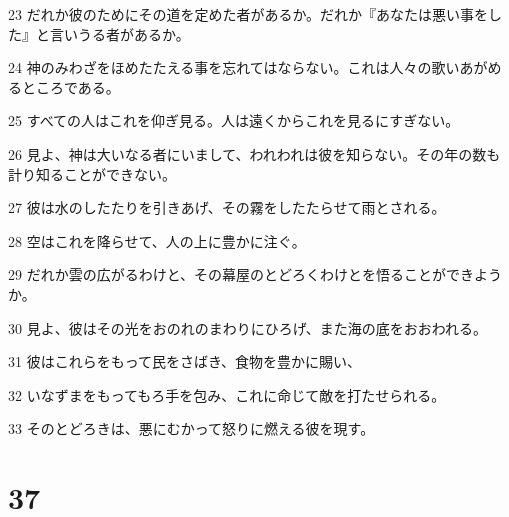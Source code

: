 \par 23 だれか彼のためにその道を定めた者があるか。だれか『あなたは悪い事をした』と言いうる者があるか。
\par 24 神のみわざをほめたたえる事を忘れてはならない。これは人々の歌いあがめるところである。
\par 25 すべての人はこれを仰ぎ見る。人は遠くからこれを見るにすぎない。
\par 26 見よ、神は大いなる者にいまして、われわれは彼を知らない。その年の数も計り知ることができない。
\par 27 彼は水のしたたりを引きあげ、その霧をしたたらせて雨とされる。
\par 28 空はこれを降らせて、人の上に豊かに注ぐ。
\par 29 だれか雲の広がるわけと、その幕屋のとどろくわけとを悟ることができようか。
\par 30 見よ、彼はその光をおのれのまわりにひろげ、また海の底をおおわれる。
\par 31 彼はこれらをもって民をさばき、食物を豊かに賜い、
\par 32 いなずまをもってもろ手を包み、これに命じて敵を打たせられる。
\par 33 そのとどろきは、悪にむかって怒りに燃える彼を現す。

\chapter{37}

